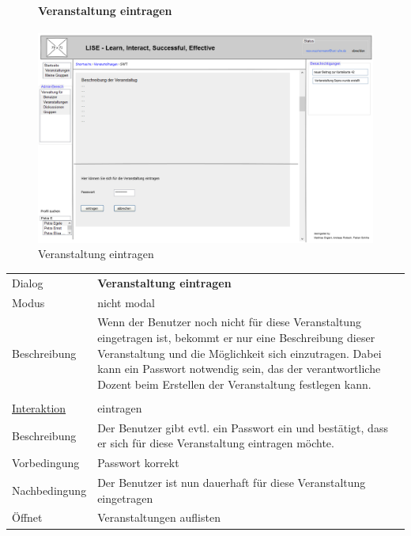 \documentclass[12pt,a4paper]{article}
\begin{document}
{\begin{figure}[H]
	\centering
	\paragraph{Veranstaltung eintragen}
	\includegraphics[width=\textwidth]{Bilder/Mockups/GUI/VeranstaltungEintragen.png}
	\caption{Veranstaltung eintragen}
	\label{VeranstaltungEintragen}
\end{figure}

\begin{tabular}{l p{12cm}}
Dialog 	 & \textbf{Veranstaltung eintragen} \\ 
Modus & nicht modal\\ 
Beschreibung   	 & Wenn der Benutzer noch nicht für diese Veranstaltung eingetragen ist, bekommt er nur eine Beschreibung dieser Veranstaltung und die Möglichkeit sich einzutragen. Dabei kann ein Passwort notwendig sein, das der verantwortliche Dozent beim Erstellen der Veranstaltung festlegen kann.\\\\ 

\underline{Interaktion}  	 & eintragen\\ 
Beschreibung   	 & Der Benutzer gibt evtl. ein Passwort ein und bestätigt, dass er sich für diese Veranstaltung eintragen möchte.  \\
Vorbedingung	 & Passwort korrekt \\
Nachbedingung	 & Der Benutzer ist nun dauerhaft für diese Veranstaltung eingetragen \\
Öffnet			 & \glqq Veranstaltungen auflisten\grqq \\
\end{tabular}\\\\

}
\end{document}
